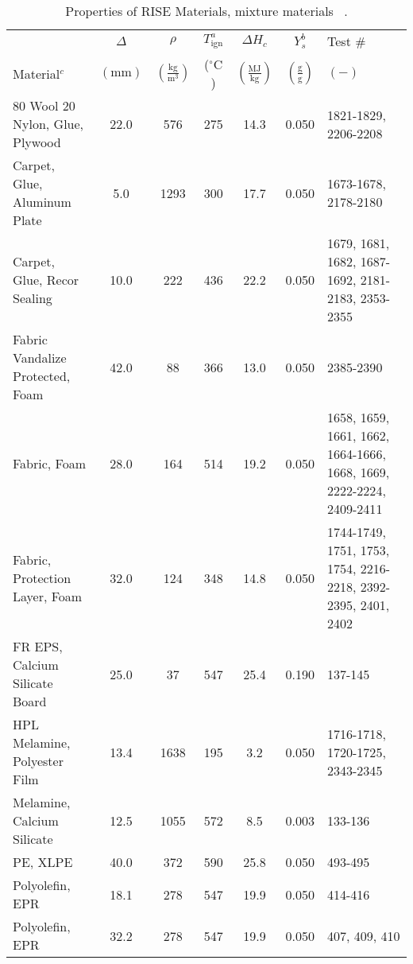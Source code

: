 \begin{table}[!h]
\caption[Properties of RISE Materials, mixture materials]{Properties of RISE Materials, mixture materials ~\cite{RISE:Fire_Database}.}
\centering
\begin{tabular}{|l|c|c|c|c|c|p{3.7cm}|}
\hline
            & \centering$\Delta$& \centering$\rho$& \centering$T_{\mathrm{ign}}^{a}$&\centering$\Delta H_{c}$&\centering$Y_{s}^{b}$ & Test \# \\
Material$^{c}$    & \centering$\mathrm{\left(mm\right)}$ & \centering$\mathrm{\left(\frac{kg}{m^{3}}\right)}$ &  \centering($\mathrm{^{\circ}C}$)   & \centering$\left(\mathrm{\frac{MJ}{kg}}\right)$ & \centering$\mathrm{\left(\frac{g}{g}\right)}$ & $\mathrm{( - )}$  \\ \hline
\hline
80 Wool 20 Nylon, Glue, Plywood                   & 22.0 & 576  & 275 & 14.3 & 0.050 & 1821-1829, 2206-2208 \\\hline
Carpet, Glue, Aluminum Plate                      & 5.0  & 1293 & 300 & 17.7 & 0.050 & 1673-1678, 2178-2180 \\\hline
Carpet, Glue, Recor Sealing                       & 10.0 & 222  & 436 & 22.2 & 0.050 & 1679, 1681, 1682, 1687-1692, 2181-2183, 2353-2355 \\\hline
Fabric Vandalize Protected, Foam                  & 42.0 & 88   & 366 & 13.0 & 0.050 & 2385-2390 \\\hline
Fabric, Foam                                      & 28.0 & 164  & 514 & 19.2 & 0.050 & 1658, 1659, 1661, 1662, 1664-1666, 1668, 1669, 2222-2224, 2409-2411 \\\hline
Fabric, Protection Layer, Foam                    & 32.0 & 124  & 348 & 14.8 & 0.050 & 1744-1749, 1751, 1753, 1754, 2216-2218, 2392-2395, 2401, 2402 \\\hline
FR EPS, Calcium Silicate Board                    & 25.0 & 37   & 547 & 25.4 & 0.190 & 137-145 \\\hline
HPL Melamine, Polyester Film                      & 13.4 & 1638 & 195 & 3.2  & 0.050 & 1716-1718, 1720-1725, 2343-2345 \\\hline
Melamine, Calcium Silicate                        & 12.5 & 1055 & 572 & 8.5  & 0.003 & 133-136 \\\hline
PE, XLPE                                          & 40.0 & 372  & 590 & 25.8 & 0.050 & 493-495 \\\hline
Polyolefin, EPR                                   & 18.1 & 278  & 547 & 19.9 & 0.050 & 414-416 \\\hline
Polyolefin, EPR                                   & 32.2 & 278  & 547 & 19.9 & 0.050 & 407, 409, 410 \\\hline

\end{tabular}
\end{table}
